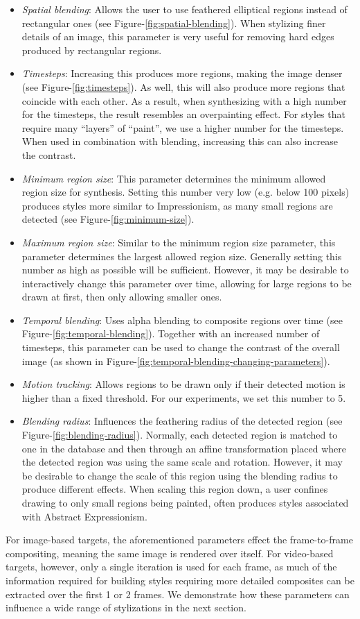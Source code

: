 \documentclass[a4paper,11pt,final]{ThesisStyle}
\begin{document}
\begin{itemize}
\item \textit{Spatial blending}: Allows the user to use feathered elliptical regions instead of rectangular ones (see Figure-\ref{fig:spatial-blending}).  When stylizing finer details of an image, this parameter is very useful for removing hard edges produced by rectangular regions.  
\item \textit{Timesteps}: Increasing this produces more regions, making the image denser (see Figure-\ref{fig:timesteps}).  As well, this will also produce more regions that coincide with each other.  As a result, when synthesizing with a high number for the timesteps, the result resembles an overpainting effect.  For styles that require many ``layers'' of ``paint'', we use a higher number for the timesteps.  When used in combination with blending, increasing this can also increase the contrast.
\item \textit{Minimum region size}: This parameter determines the minimum allowed region size for synthesis.  Setting this number very low (e.g. below 100 pixels) produces styles more similar to Impressionism, as many small regions are detected (see Figure-\ref{fig:minimum-size}).  
\item \textit{Maximum region size}: Similar to the minimum region size parameter, this parameter determines the largest allowed region size. Generally setting this number as high as possible will be sufficient.  However, it may be desirable to interactively change this parameter over time, allowing for large regions to be drawn at first, then only allowing smaller ones. 
\item \textit{Temporal blending}: Uses alpha blending to composite regions over time (see Figure-\ref{fig:temporal-blending}).  Together with an increased number of timesteps, this parameter can be used to change the contrast of the overall image (as shown in Figure-\ref{fig:temporal-blending-changing-parameters}).  
\item \textit{Motion tracking}: Allows regions to be drawn only if their detected motion is higher than a fixed threshold.  For our experiments, we set this number to 5.  
\item \textit{Blending radius}: Influences the feathering radius of the detected region (see Figure-\ref{fig:blending-radius}).  Normally, each detected region is matched to one in the database and then through an affine transformation placed where the detected region was using the same scale and rotation.  However, it may be desirable to change the scale of this region using the blending radius to produce different effects.  When scaling this region down, a user confines drawing to only small regions being painted, often produces styles associated with Abstract Expressionism.
\end{itemize}
For image-based targets, the aforementioned parameters effect the frame-to-frame compositing, meaning the same image is rendered over itself.  For video-based targets, however, only a single iteration is used for each frame, as much of the information required for building styles requiring more detailed composites can be extracted over the first 1 or 2 frames.  We demonstrate how these parameters can influence a wide range of stylizations in the next section.
\end{document}

